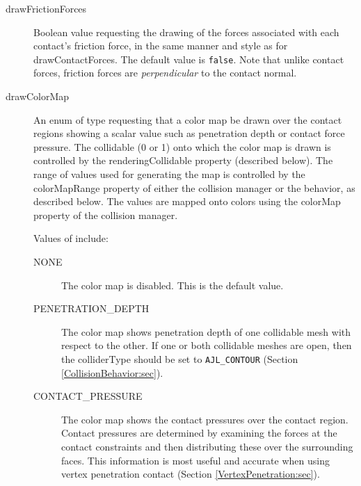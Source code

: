 \begin{description}
\item[drawFrictionForces]\mbox{}

Boolean value requesting the drawing of the forces associated with
each contact's friction force, in the same manner and style as for
{\sf drawContactForces}. The default value is {\tt false}. Note that
unlike contact forces, friction forces are {\it perpendicular} to the
contact normal.

\item[drawColorMap]\mbox{}

An enum of type
requesting that a color map be drawn over the contact regions showing
a scalar value such as penetration depth or contact force pressure.
The collidable (0 or 1) onto which the color map is drawn is
controlled by the {\sf renderingCollidable} property (described
below). The range of values used for generating the map is controlled
by the {\sf colorMapRange} property of either the collision manager or
the behavior, as described below.  The values are mapped onto colors
using the {\sf colorMap} property of the collision manager.

Values of
include:

\begin{description}

\item[NONE]\mbox{}

The color map is disabled. This is the default value.

\item[PENETRATION\_DEPTH]\mbox{}

The color map shows penetration depth of one collidable mesh with
respect to the other. If one or both collidable meshes are open, then
the {\sf colliderType} should be set to {\tt AJL\_CONTOUR} (Section
\ref{CollisionBehavior:sec}).

\item[CONTACT\_PRESSURE]\mbox{}

The color map shows the contact pressures over the contact region.
Contact pressures are determined by examining the forces at the
contact constraints and then distributing these over the surrounding
faces. This information is most useful and accurate when using
vertex penetration contact (Section \ref{VertexPenetration:sec}).

\end{description}


\end{description}
